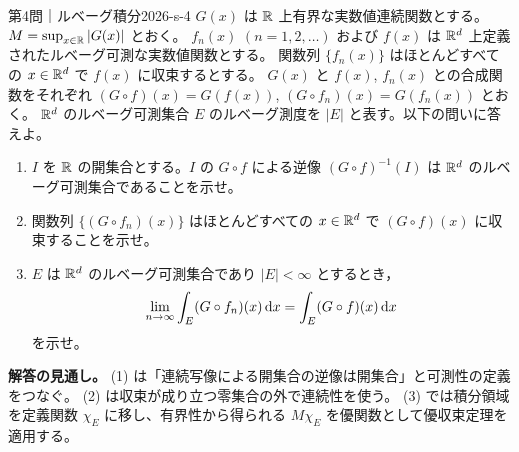 \begin{problem}{第4問｜ルベーグ積分}{2026-s-4}
$G(x)$ は $\mathbb{R}$ 上有界な実数値連続関数とする。$M=\sup_{x\in\mathbb{R}}|G(x)|$ とおく。
$f_n(x)$ $(n=1,2,\ldots)$ および $f(x)$ は $\mathbb{R}^d$ 上定義されたルベーグ可測な実数値関数とする。
関数列 $\{f_n(x)\}$ はほとんどすべての $x\in\mathbb{R}^d$ で $f(x)$ に収束するとする。
$G(x)$ と $f(x)$, $f_n(x)$ との合成関数をそれぞれ $(G\circ f)(x)=G(f(x))$, $(G\circ f_n)(x)=G(f_n(x))$ とおく。
$\mathbb{R}^d$ のルベーグ可測集合 $E$ のルベーグ測度を $|E|$ と表す。以下の問いに答えよ。
\begin{enumerate}
  \item[(1)] $I$ を $\mathbb{R}$ の開集合とする。$I$ の $G\circ f$ による逆像 $(G\circ f)^{-1}(I)$ は $\mathbb{R}^d$ のルベーグ可測集合であることを示せ。
  \item[(2)] 関数列 $\{(G\circ f_n)(x)\}$ はほとんどすべての $x\in\mathbb{R}^d$ で $(G\circ f)(x)$ に収束することを示せ。
  \item[(3)] $E$ は $\mathbb{R}^d$ のルベーグ可測集合であり $|E|<\infty$ とするとき，
  \[
  \lim_{n\to\infty}\int_E(G\circ f_n)(x)\,\mathrm{d} x
  =\int_E(G\circ f)(x)\,\mathrm{d} x
  \]
  を示せ。
\end{enumerate}
\end{problem}
\begin{memo*}
\textbf{解答の見通し。}
(1) は「連続写像による開集合の逆像は開集合」と可測性の定義をつなぐ。
(2) は収束が成り立つ零集合の外で連続性を使う。
(3) では積分領域を定義関数 $\chi_E$ に移し、有界性から得られる
$M\chi_E$ を優関数として優収束定理を適用する。
\end{memo*}
